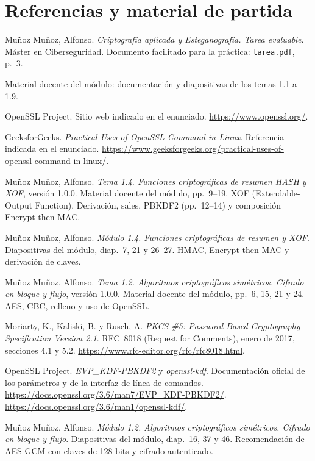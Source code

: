 \chapter{Referencias y material de partida}
\label{sec:referencias}

\begin{enumerate}[label={[\arabic*]}]
  \item Muñoz Muñoz, Alfonso. \textit{Criptografía aplicada y Esteganografía. Tarea evaluable}. Máster en Ciberseguridad. Documento facilitado para la práctica: \texttt{tarea.pdf}, p.~3.
  \item Material docente del módulo: documentación y diapositivas de los temas 1.1 a 1.9.
  \item OpenSSL Project. Sitio web indicado en el enunciado. \url{https://www.openssl.org/}.
  \item GeeksforGeeks. \textit{Practical Uses of OpenSSL Command in Linux}. Referencia indicada en el enunciado. \url{https://www.geeksforgeeks.org/practical-uses-of-openssl-command-in-linux/}.
  \item\label{ref:tema-kdf} Muñoz Muñoz, Alfonso. \textit{Tema 1.4. Funciones criptográficas de resumen HASH y XOF}, versión 1.0.0. Material docente del módulo, pp.~9--19. XOF (Extendable-Output Function). Derivación, sales, PBKDF2 (pp.~12--14) y composición Encrypt-then-MAC.
  \item\label{ref:slides-kdf} Muñoz Muñoz, Alfonso. \textit{Módulo 1.4. Funciones criptográficas de resumen y XOF}. Diapositivas del módulo, diap.~7, 21 y 26--27. HMAC, Encrypt-then-MAC y derivación de claves.
  \item\label{ref:tema-aes} Muñoz Muñoz, Alfonso. \textit{Tema 1.2. Algoritmos criptográficos simétricos. Cifrado en bloque y flujo}, versión 1.0.0. Material docente del módulo, pp.~6, 15, 21 y 24. AES, CBC, relleno y uso de OpenSSL.
  \item\label{ref:rfc-pbkdf2} Moriarty, K., Kaliski, B. y Rusch, A. \textit{PKCS \#5: Password-Based Cryptography Specification Version 2.1}. RFC~8018 (Request for Comments), enero de 2017, secciones 4.1 y 5.2. \url{https://www.rfc-editor.org/rfc/rfc8018.html}.
  \item\label{ref:openssl-pbkdf2}\label{ref:openssl-kdf-cli} OpenSSL Project. \textit{EVP\_KDF-PBKDF2} y \textit{openssl-kdf}. Documentación oficial de los parámetros y de la interfaz de línea de comandos. \url{https://docs.openssl.org/3.6/man7/EVP_KDF-PBKDF2/}. \url{https://docs.openssl.org/3.6/man1/openssl-kdf/}.
  \item\label{ref:slides-gcm} Muñoz Muñoz, Alfonso. \textit{Módulo 1.2. Algoritmos criptográficos simétricos. Cifrado en bloque y flujo}. Diapositivas del módulo, diap.~16, 37 y 46. Recomendación de AES-GCM con claves de 128 bits y cifrado autenticado.

\end{enumerate}
